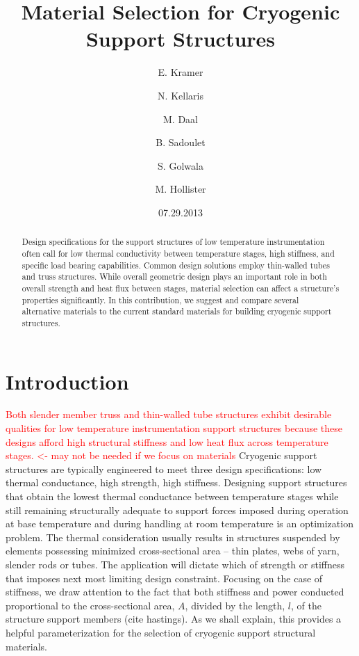 \documentclass[final]{svjour2}
\begin{document}
\newcommand{\hdblarrow}{H\makebox[0.9ex][l]{$\downdownarrows$}-}
\title{Material Selection for Cryogenic Support Structures}

\author{E. Kramer \and N. Kellaris  \and M. Daal  \and B. Sadoulet \and S. Golwala \and M. Hollister}


\date{07.29.2013}

\maketitle

\begin{abstract}

Design specifications for the support structures of low temperature instrumentation often call for low thermal conductivity between temperature stages, high stiffness, and specific load bearing capabilities. Common design solutions employ thin-walled tubes and truss structures.  While overall geometric design plays an important role in both overall strength and heat flux between stages, material selection can affect a structure's properties significantly.  In this contribution, we suggest and compare several alternative materials to the current standard materials for building cryogenic support structures.

 
\end{abstract}

\section{Introduction}
\textcolor{red}{Both slender member truss and thin-walled tube structures exhibit desirable qualities for low temperature instrumentation support structures because these designs afford high structural stiffness and low heat flux across temperature stages. <- may not be needed if we focus on materials}  
Cryogenic support structures are typically engineered to meet three design specifications: low thermal conductance, high strength, high stiffness. Designing support structures that obtain the lowest thermal conductance between temperature stages while still remaining structurally adequate to support forces imposed during operation at base temperature and during handling at room temperature is an optimization problem. The thermal consideration usually results in structures suspended by elements possessing minimized cross-sectional area -- thin plates, webs of yarn, slender rods or tubes. The application will dictate which of strength or stiffness that imposes next most limiting design constraint. Focusing on the case of stiffness, we draw attention to the fact that both stiffness and power conducted proportional to the cross-sectional area, $A$,  divided by the length, $l$, of the structure support members (cite hastings). As we shall explain, this provides a helpful parameterization for the selection of cryogenic support structural materials.  
\end{document}

